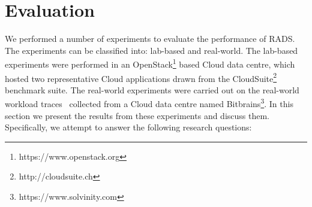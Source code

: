 \section{Evaluation}
\label{sec:experiments}
\noindent We performed a number of experiments to evaluate the performance of RADS. The experiments can be classified into: lab-based and real-world. The lab-based experiments were performed in an OpenStack\footnote{https://www.openstack.org} based Cloud data centre, which hosted two representative Cloud applications drawn from the CloudSuite\footnote{http://cloudsuite.ch} benchmark suite. The real-world experiments were carried out on the real-world workload traces~\cite{workloadCCGRID:2015} collected from a Cloud data centre named Bitbrains\footnote{https://www.solvinity.com}.
In this section we present the results from these experiments and discuss them. 
Specifically, we attempt to answer the following research questions: 
